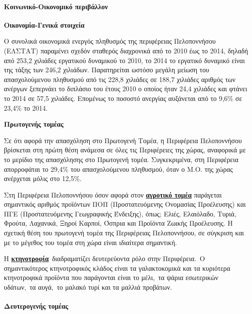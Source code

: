 \documentclass[12pt]{article}
\begin{document}
	\paragraph{Κοινωνικό-Οικονομικό περιβάλλον}
	
	\textbf{Οικονομία-Γενικά στοιχεία}
	
	Ο συνολικά οικονομικά ενεργός πληθυσμός της περιφέρειας Πελοποννήσου (ΕΛΣΤΑΤ) παραμένει σχεδόν σταθερός διαχρονικά από το 2010 έως το 2014, δηλαδή από 253,2 χιλιάδες εργατικού δυναμικού το 2010, το 2014 το εργατικό δυναμικό είναι της τάξης των 246,2 χιλιάδων. Παρατηρείται ωστόσο μεγάλη μείωση του απασχολούμενου πληθυσμού από τις 228,8 χιλιάδες σε 188,7 χιλιάδες αριθμός των ανέργων ξεπερνάει το διπλάσιο του έτους 2010 ο οποίος ήταν 24,4 χιλιάδες και φτάνει το 2014 σε 57,5 χιλιάδες. Επομένως το ποσοστό ανεργίας αυξάνεται από το 9,6\% σε 23,4\% το 2014.
	
	\textbf{Πρωτογενής τομέας}
	
	Σε ότι αφορά την απασχόληση στο Πρωτογενή Τομέα, η Περιφέρεια Πελοποννήσου βρίσκεται στη πρώτη θέση ανάμεσα σε όλες τις Περιφέρειες της  χώρας, αναφορικά με το μερίδιο της απασχόλησης στο Πρωτογενή τομέα. Συγκεκριμένα, στη Περιφέρεια απορροφάται το 29,4\% του απασχολούμενου πληθυσμού, όταν ο Μ.Ο. της χώρας ανέρχεται μόλις στο 12,5\%.
	
	Στη Περιφέρεια Πελοποννήσου όσον αφορά στον \textbf{\underline{αγροτικό τομέα}} παράγεται σημαντικός αριθμός προϊόντων ΠΟΠ (Προστατευόμενης Ονομασίας Προέλευσης) και ΠΓΕ (Προστατευόμενης Γεωγραφικής Ένδειξης), όπως; Ελιές, Ελαιόλαδο, Τυριά, Φρούτα, Λαχανικά, Ξηροί Καρποί, Όσπρια και Προϊόντα Ζωικής Προέλευσης. Η σχετική θέση του πρωτογενή τομέα της Περιφέρειας Πελοποννήσου, σε σύγκριση και με το μέγεθος του τομέα στη χώρα είναι ιδιαίτερα σημαντική.
	
	Η \textbf{\underline{κτηνοτροφία}} διαδραματίζει δευτερεύοντα ρόλο στην Περιφέρεια. Ο σημαντικότερος κτηνοτροφικός κλάδος είναι τα γαλακτοκομικά και τα κυριότερα κτηνοτροφικά προϊόντα που παράγονται είναι το μέλι, τα ψάρια εσωτερικών υδάτων, τα αυγά, το μαλακό τυρί και τα μαλλιά προβάτων.
	
	\paragraph{Δευτερογενής τομέας}
	
\end{document}
